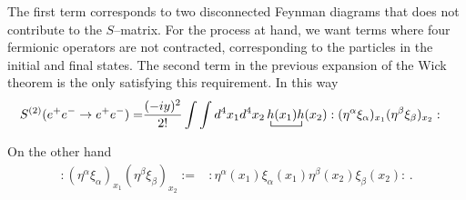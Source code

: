 The first term corresponds to two  disconnected Feynman diagrams that does not contribute to the $S$--matrix. For the process at hand, we want terms where four fermionic operators are not contracted, corresponding to the particles in the initial and final states. The second term in the previous expansion of the Wick theorem is the only satisfying this requirement. In this way
\begin{align}
  S^{(2)}(e^+ e^-\to e^+e^-)=&\frac{(-iy)^2}{2!}\int\int d^4x_1 d^4x_2
\bcontraction{\,}{h}{(x_1)}{h}
\,h(x_1)h(x_2):(\eta^{\alpha} \xi_{\alpha})_{x_1}(\eta^{\beta} \xi_{\beta})_{x_2}:
\end{align}

On the other hand 
\begin{align}
\label{eq:156f}
  :(\eta^{\alpha} \xi_{\alpha})_{x_1}(\eta^{\beta} \xi_{\beta})_{x_2}:=&
:\eta^{\alpha}(x_1) \xi_{\alpha}(x_1) \eta^{\beta}(x_2) \xi_{\beta}(x_2):\,.
\end{align}




